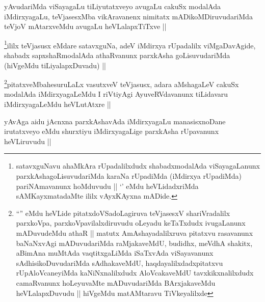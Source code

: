 
\begin{artha}
yAvudariMda viSayagaLu tiLiyutatxveyo avugaLu cakuSx modalAda
iMdirxyagaLu, teVjasesxMba vikAravanenx nimitatx mADikoMDiruvudariMda
teVjoV mAtarxveMdu avugaLu heVLalapxTiTxve ||
\end{artha}


\begin{artha}
\footnote[1]{satavxguNavu ahaMkAra rUpadalilxdudx shabadxmodalAda
  viSayagaLanunx parxkAshagoLisuvudariMda karaNa rUpadiMda (iMdirxya
  rUpadiMda) pariNAmavanunx hoMduvudu || `\stext' eMdu heVLidadxriMda
  sAMKayxmatadaMte ililx vAyxKAyxna mADide.}ililx teVjasusx eMdare satavxguNa, adeV iMdirxya
rUpadalilx viMgaDavAgide, shabadx sapxshaRmodalAda athaRvanunx
parxkAsha goLisuvudariMda (hiVgeMdu tiLiyalapxDuvadu) ||
\end{artha}

\begin{artha}
\footnote[1]{``\stext'' eMdu heVLide pitatxdoVSadoLagiruva teVjasesxV
  shariVradalilx parxkoVpa, parxkoVpavilalxdiruvudu oLeyadu keTaTxdudx
  ivugaLanunx mADuvudeMdu athaR || matutx AmAshayadalilxruva pitatxvu rasavanunx baNaNxvAgi
  mADuvudariMda raMjakaveMdU, budidhx, meVdhA shakitx, aBimAna muMtAda
  vaqtitxgaLiMda iSaTxvAda viSayavanunx sAdhisikoDuvudariMda
  sAdhakaveMdU, haqdayalilxdadxpitatxvu rUpAloVcaneyiMda
  kaNiNxnalilxdudx AloVcakaveMdU tavxkikxnalilxdudx camaRvanunx
  hoLeyuvaMte mADuvudariMda BArxjakaveMdu heVLalapxDuvudu || hiVgeMdu
  matAMtaravu TiVkeyalilxde}pitatxveMbahesuruLaLx vasutxveV teVjasusx, adara aMshagaLeV cakuSx
modalAda iMdirxyagaLeMdu I riVtiyAgi AyuveRVdavanunx tiLidavaru
iMdirxyagaLeMdu heVLutAtxre ||
\end{artha}


\begin{artha}
yAvAga aidu jAcnxna parxkAshavAda iMdirxyagaLu manasisxnoDane
irutatxveyo eMdu shurxtiyu iMdirxyagaLige parxkAsha rUpavanunx
heVLiruvudu ||
\end{artha}

